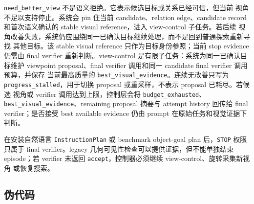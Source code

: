 \documentclass[UTF8,zihao=-4]{ctexart}
\begin{document}
\texttt{need\_better\_view} 不是语义拒绝。它表示候选目标或关系已经可信，但当前
视角不足以支持停止。系统会 pin 住当前 candidate、relation edge、candidate
record 和首次语义确认的 stable visual reference，进入 view-control 子任务。若后续
视角改善失败，系统仍应围绕同一已确认目标继续处理，而不是回到普通探索重新寻找
其他目标。该 stable visual reference 只作为目标身份参照；当前 stop evidence 仍需由
final verifier 重新判断。view-control 是有限子任务：系统为同一已确认目标维护
viewpoint proposal、final verifier 调用和同一 candidate final verifier 调用预算，并保存
当前最高质量的 \texttt{best\_visual\_evidence}。连续无改善只写为
\texttt{progress\_stalled}，用于切换 proposal 或重采样，不表示 proposal 已耗尽。若候选
视角或 verifier 调用达到上限，控制层会将 \texttt{budget\_exhausted}、
\texttt{best\_visual\_evidence}、remaining proposal 摘要与 attempt history 回传给 final
verifier；是否接受 best available evidence 仍由 prompt 在原始任务和视觉证据下判断。

在安装自然语言 \texttt{InstructionPlan} 或 benchmark object-goal plan 后，\texttt{STOP}
权限只属于 final verifier。legacy 几何可见性检查可以提供证据，但不能单独结束
episode；若 verifier 未返回 \texttt{accept}，控制器必须继续 view-control、旋转采集新视角
或恢复搜索。

\subsection{伪代码}
\end{document}
